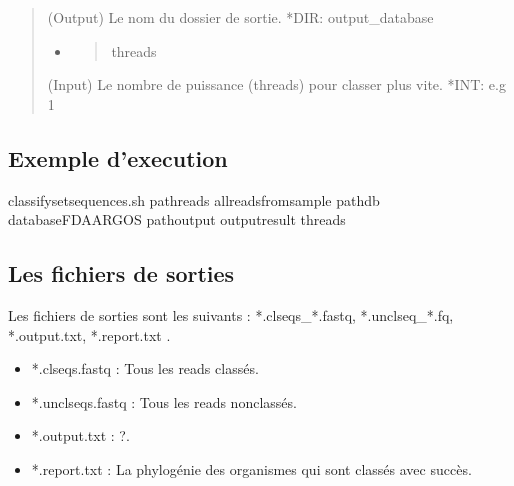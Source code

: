 \documentclass[letterpaper,10pt,french]{sphinxmanual}
\begin{document}
\begin{quote}
\begin{itemize}
\end{itemize}

(Output) Le nom du dossier de sortie.                                            *DIR: output\_database
\begin{itemize}
\item {} \begin{quote}\begin{description}
\item[{\sphinxhyphen{}threads}] \leavevmode
\end{description}\end{quote}

\end{itemize}

(Input)  Le nombre de puissance (threads) pour classer plus vite.                *INT: e.g 1
\end{quote}


\subsection{Exemple d’execution}
\label{\detokenize{bash/classify_set_sequences.sh:exemple-d-execution}}
\begin{sphinxVerbatim}[commandchars=\\\{\}]
classify\PYGZus{}set\PYGZus{}sequences.sh \PYGZhy{}path\PYGZus{}reads all\PYGZus{}reads\PYGZus{}from\PYGZus{}sample \PYGZhy{}path\PYGZus{}db database\PYGZus{}FDA\PYGZus{}ARGOS \PYGZhy{}path\PYGZus{}output output\PYGZus{}result \PYGZhy{}threads 
\end{sphinxVerbatim}


\subsection{Les fichiers de sorties}
\label{\detokenize{bash/classify_set_sequences.sh:les-fichiers-de-sorties}}
Les fichiers de sorties sont les suivants : *.clseqs\_*.fastq, *.unclseq\_*.fq, *.output.txt, *.report.txt .
\begin{itemize}
\item {} 
*.clseqs.fastq : Tous les reads classés.

\item {} 
*.unclseqs.fastq : Tous les reads non\sphinxhyphen{}classés.

\item {} 
*.output.txt : ?.

\item {} 
*.report.txt : La phylogénie des organismes qui sont classés avec succès.

\end{itemize}
\end{document}
